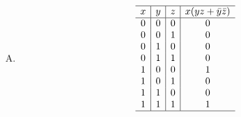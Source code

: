 {{\begin{practices}
\begin{enumerate}[A.]
{\begin{table}[H]
                        \[
                            \begin{array}{c|c|c|c}
                                \hline
                                x & y & z & x\bar{y} + \overline{xyz} \\
                                \hline
                                0 & 0 & 0 & 1 \\
                                0 & 0 & 1 & 1 \\
                                0 & 1 & 0 & 1 \\
                                0 & 1 & 1 & 1 \\
                                1 & 0 & 0 & 1 \\
                                1 & 0 & 1 & 1 \\
                                1 & 1 & 0 & 1 \\
                                1 & 1 & 1 & 0 \\
                                \hline
                            \end{array}
                        \]
                    \end{table}
                }
                \item
                {
                    \begin{table}[H]
                        \centering

                        \[
                            \begin{array}{c|c|c|c}
                                \hline
                                x & y & z & x(yz + \bar{y}\bar{z}) \\
                                \hline
                                0 & 0 & 0 & 0 \\
                                0 & 0 & 1 & 0 \\
                                0 & 1 & 0 & 0 \\
                                0 & 1 & 1 & 0 \\
                                1 & 0 & 0 & 1 \\
                                1 & 0 & 1 & 0 \\
                                1 & 1 & 0 & 0 \\
                                1 & 1 & 1 & 1 \\
                                \hline
                            \end{array}
                        \]
                    \end{table}
                }
            \end{enumerate}
        \end{practices}

}}
